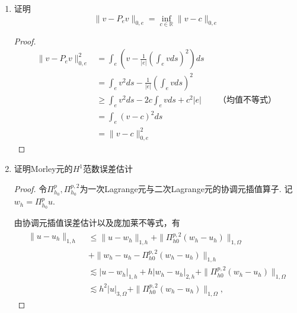 \documentclass[12pt,a4paper]{article}
\begin{document}
\begin{enumerate}
\begin{proof}
			有
			
			$$\int_0^L - \xi^{\prime\prime} \xi d\xi =\lambda \int_0^L \xi^2 d\xi$$
			分部积分
			$$\int_0^L (\xi^{\prime})^2 d\xi  =\lambda \int_0^L \xi^2 d\xi  $$
			$$\lambda \|\xi\|_{0,e}^2 = |\xi|_{1,e}^2$$
			
			注意到最小特征值$\lambda = \frac{\pi^2}{L^2}$,进而
			
			$$\frac{\pi^2}{L^2} \|\xi\|_{0,e}^2 \leq |\xi|_{1,e}^2$$
			
		\end{proof}
		
		
		
		\item 证明
		$$\|v-P_ev\|_{0,e}=\inf_{c\in\mathbb{R}}\|v-c\|_{0,e}$$
		
		\begin{proof}
			
			$$\begin{aligned}
				\|v-P_e v\|_{0,e}^2 &= \int_e \left(v-\frac{1}{|e|}(\int_e v ds)^2\right)ds\\
				& = \int_e v^2 ds - \frac{1}{|e|}(\int_e v ds)^2\\
				& \geq \int_e v^2 ds - 2c \int_e v ds + c^2 |e| \qquad \text{（均值不等式）}\\
				& = \int_e (v-c)^2 ds\\
				& = \|v-c\|_{0,e}^2
			\end{aligned}$$
			
		\end{proof}
		
		\item 证明Morley元的$H^{1}$范数误差估计
		
		\begin{proof}
			令$\Pi_{h_0}^p,\Pi_{h_0}^{p,2}$为一次Lagrange元与二次Lagrange元的协调元插值算子. 记$w_h = \Pi_{h_0}^p u$.
			
			由协调元插值误差估计以及庞加莱不等式，有
			\begin{equation}\label{eq1}
				\begin{aligned}
					\begin{aligned}\|u-u_h\|_{1,h}\end{aligned}& \leqslant\|u-w_h\|_{1,h}+\|\Pi_{h0}^{p,2}(w_h-u_h)\|_{1,\Omega}  \\
					&+\|w_h-u_h-\Pi_{h0}^{p,2}(w_h-u_h)\|_{1,h} \\
					&\lesssim|u-w_h|_{1,h}+h|w_h-u_h|_{2,h}+\|\Pi_{h0}^{p,2}(w_h-u_h)\|_{1,\Omega} \\
					&\lesssim h^2|u|_{3,\Omega}+\|\Pi_{h0}^{p,2}(w_h-u_h)\|_{1,\Omega},
				\end{aligned}
			\end{equation}
			

\end{proof}
\end{enumerate}
\end{document}
